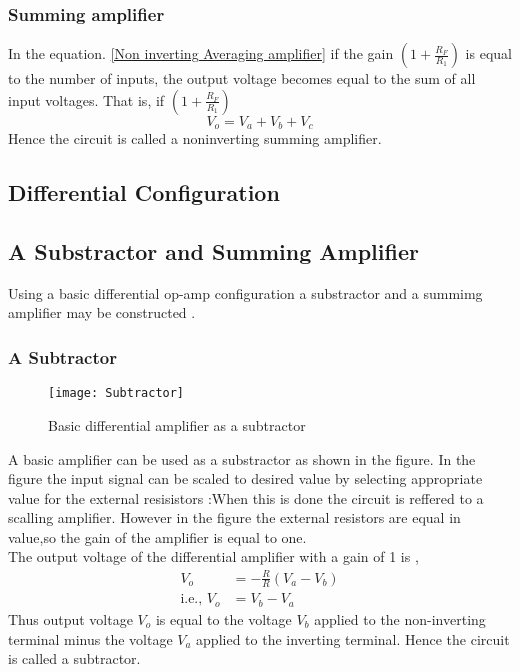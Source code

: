    \subsubsection{Summing amplifier}
   In the equation. \ref{Non inverting Averaging amplifier}  if the gain $\left(1+\frac{R_{F}}{R_{1}}  \right)$ is equal to the number of inputs, the output voltage becomes equal to the sum of all input voltages. That is, if $\left(1+\frac{R_{F}}{R_{1}}  \right)$
   \begin{equation}
   V_{o}=V_{a}+V_{b}+V_{c}
   \end{equation}
   Hence the circuit is called a noninverting summing amplifier.
   \subsection{Differential Configuration}
   \subsection{A Substractor and Summing Amplifier}
   Using a basic differential op-amp configuration a substractor and a summimg amplifier may be constructed .
   \subsubsection{A Subtractor}
   \begin{figure}[H]
   	\centering
   	\texttt{[image: Subtractor]}
   	\caption{Basic differential amplifier as a subtractor}
   	\label{Subtractor}
   \end{figure}
   A basic amplifier can be used as a substractor as shown in the figure. In the figure the input signal can be scaled to desired value by selecting appropriate value for the external resisistors :When this is done the circuit is reffered to a scalling amplifier. However in the figure the external resistors are equal in value,so the gain of the amplifier is equal to one.\\
   The output voltage of the differential amplifier with a gain of 1 is ,
   \begin{align}
   V_o&=-\frac{R}{R}(V_a-V_b)\\
   \text{i.e., }V_o&=V_b-V_a
   \end{align}
   Thus output voltage $V_o$ is equal to the voltage $V_b$ applied to the non-inverting terminal minus the voltage $V_a$ applied to the inverting terminal. Hence the circuit is called a subtractor.
